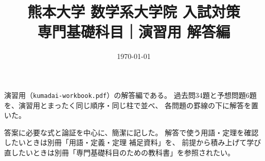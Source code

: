 \documentclass[uplatex, dvipdfmx]{jsreport}
\title{熊本大学 数学系大学院 入試対策\\{\Large 専門基礎科目｜演習用 解答編}}
\author{}
\date{\today}
\begin{document}
\maketitle

\begin{memo*}
演習用（\texttt{kumadai-workbook.pdf}）の解答編である。
過去問34題と予想問題6題を、演習用とまったく同じ順序・同じ柱で並べ、
各問題の罫線の下に解答を置いた。

答案に必要な式と論証を中心に、簡潔に記した。
解答で使う用語・定理を確認したいときは別冊「用語・定義・定理 補足資料」を、
前提から積み上げて学び直したいときは別冊「専門基礎科目のための教科書」を参照されたい。
\end{memo*}

\tableofcontents








\end{document}
